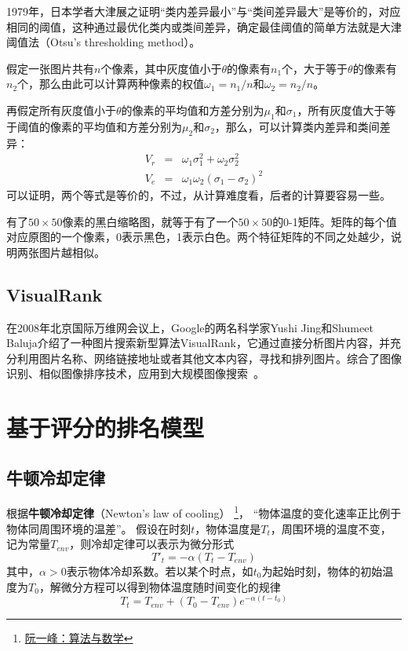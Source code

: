 1979年，日本学者大津展之证明“类内差异最小”与“类间差异最大”是等价的，对应相同的阈值，这种通过最优化类内或类间差异，确定最佳阈值的简单方法就是大津阈值法（Otsu's thresholding method）。

假定一张图片共有$n$个像素，其中灰度值小于$\theta$的像素有$n_1$个，大于等于$\theta$的像素有$n_2$个，那么由此可以计算两种像素的权值$\omega_1 = n_1/n$和$\omega_2=n_2/n$。

再假定所有灰度值小于$\theta$的像素的平均值和方差分别为$\mu_1$和$\sigma_1$，所有灰度值大于等于阈值的像素的平均值和方差分别为$\mu_2$和$\sigma_2$，那么，可以计算类内差异和类间差异：
\begin{eqnarray}
  V_r &=& \omega_1\sigma_1^2 + \omega_2\sigma_2^2 \\
  V_e &=& \omega_1\omega_2(\sigma_1 - \sigma_2)^2
\end{eqnarray}
可以证明，两个等式是等价的，不过，从计算难度看，后者的计算要容易一些。

有了$50\times 50$像素的黑白缩略图，就等于有了一个$50\times 50$的0-1矩阵。矩阵的每个值对应原图的一个像素，0表示黑色，1表示白色。两个特征矩阵的不同之处越少，说明两张图片越相似。

\section{VisualRank}
在2008年北京国际万维网会议上，Google的两名科学家Yushi Jing和Shumeet Baluja介绍了一种图片搜索新型算法VisualRank，它通过直接分析图片内容，并充分利用图片名称、网络链接地址或者其他文本内容，寻找和排列图片。综合了图像识别、相似图像排序技术，应用到大规模图像搜索~\cite{jing2008visualrank}。

\chapter{基于评分的排名模型}
\section{牛顿冷却定律}
根据\textbf{牛顿冷却定律}（Newton's law of cooling）
\footnote{\href{http://www.ruanyifeng.com/blog/algorithm/}{阮一峰：算法与数学}}，
“物体温度的变化速率正比例于物体同周围环境的温差”。%
假设在时刻$t$，物体温度是$T_t$，周围环境的温度不变，记为常量$T_{env}$，则冷却定律可以表示为微分形式
\begin{equation}
    T'_t = -\alpha(T_t-T_{env})
\end{equation}
其中，$\alpha>0$表示物体冷却系数。若以某个时点，如$t_0$为起始时刻，物体的初始温度为$T_0$，解微分方程可以得到物体温度随时间变化的规律
\begin{equation}
    T_t = T_{env} + (T_0 - T_{env})e^{-\alpha(t-t_0)}
\end{equation}

